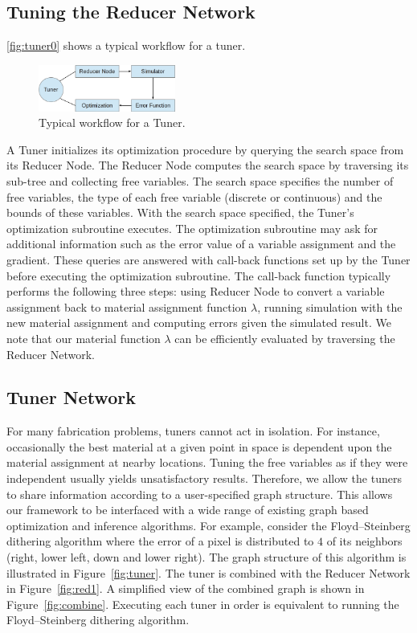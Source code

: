 \documentclass[annual]{acmsiggraph}
\begin{document}
\subsection{Tuning the Reducer Network}
\autoref{fig:tuner0} shows a typical workflow for a tuner.
\begin{figure}
\includegraphics[width=0.4\textwidth]{figure/tuner0.png}
\caption{Typical workflow for a Tuner.}
\label{fig:tuner0}
\end{figure}
A Tuner initializes its optimization procedure by querying the search space from its Reducer Node.
The Reducer Node computes the search space by traversing its sub-tree and collecting
free variables. The search space specifies the number of free variables, the type of each free variable
(discrete or continuous) and the bounds of these variables. 
With the search space specified, the Tuner's optimization subroutine executes.
The optimization subroutine may ask for additional information such as
the error value of a variable assignment and the gradient. These queries are answered
with call-back functions set up by the Tuner before executing the optimization subroutine. 
The call-back function typically performs the following three steps:
using Reducer Node to convert a variable assignment back to material assignment
function $\lambda$, running simulation with the new material assignment
and computing errors given the simulated result.
We note that our material function $\lambda$ can 
be efficiently evaluated by traversing the Reducer Network.
\subsection{Tuner Network}
For many fabrication problems, tuners cannot act in isolation. For instance,  occasionally the best material at a given point in space is dependent upon the material assignment at nearby locations.  Tuning the free variables as if they were independent usually yields unsatisfactory results. Therefore, we allow the tuners to share information according to a user-specified graph structure.  This allows our framework to be interfaced with a wide range of existing graph based optimization and inference algorithms. For example, consider the Floyd–Steinberg dithering algorithm where the error of a pixel is distributed
to $4$ of its neighbors (right, lower left, down and lower right).  The graph structure of this algorithm is illustrated in Figure~\ref{fig:tuner}. The tuner is combined with the Reducer Network in Figure~\ref{fig:red1}. A simplified view of the combined graph is shown in Figure~\ref{fig:combine}. Executing each tuner in order is equivalent to running the Floyd–Steinberg dithering algorithm. 
\end{document}
